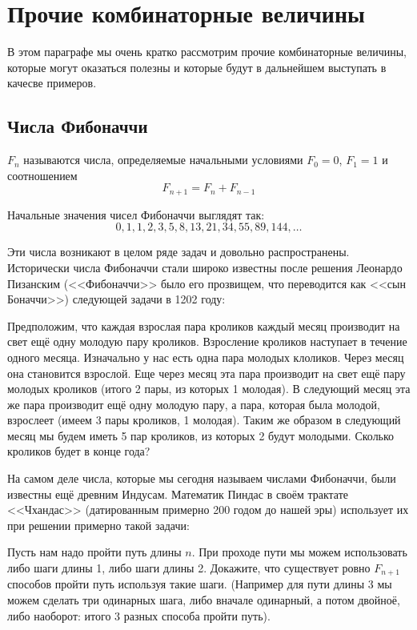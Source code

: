 \section{Прочие комбинаторные величины}

В этом параграфе мы очень кратко рассмотрим прочие комбинаторные величины, которые могут оказаться полезны и которые будут в дальнейшем выступать в качесве примеров.

\subsection{Числа Фибоначчи}

\begin{definition}
 $F_n$ называются числа, определяемые начальными условиями $F_0 = 0$, $F_1 = 1$ и соотношением
$$F_{n+1} = F_n + F_{n-1}$$
\end{definition}

Начальные значения чисел Фибоначчи выглядят так:
$$0, 1, 1, 2, 3, 5, 8, 13, 21, 34, 55, 89, 144, \ldots$$

Эти числа возникают в целом ряде задач и довольно распространены. Исторически числа Фибоначчи стали широко известны после решения Леонардо Пизанским (<<Фибоначчи>>  было его прозвищем, что переводится как <<сын Боначчи>>) следующей задачи в 1202 году:

\begin{exercise}
Предположим, что каждая взрослая пара кроликов каждый месяц производит на свет ещё одну молодую пару кроликов. Взросление кроликов наступает в течение одного месяца. Изначально у нас есть одна пара молодых клоликов. Через месяц она становится взрослой. Еще через месяц эта пара производит на свет ещё пару молодых кроликов (итого 2 пары, из которых 1 молодая). В следующий месяц эта же пара производит ещё одну молодую пару, а пара, которая была молодой, взрослеет (имеем 3 пары кроликов, 1 молодая). Таким же образом в следующий месяц мы будем иметь 5 пар кроликов, из которых 2 будут молодыми. Сколько кроликов будет в конце года?
\end{exercise}

На самом деле числа, которые мы сегодня называем числами Фибоначчи, были известны ещё древним Индусам. Математик Пиндас в своём трактате <<Чхандас>> (датированным примерно 200 годом до нашей эры) использует их при решении примерно такой задачи:

\begin{exercise}
Пусть нам надо пройти путь длины $n$. При проходе пути мы можем использовать либо шаги длины 1, либо шаги длины 2. Докажите, что существует ровно $F_{n+1}$ способов пройти путь используя такие шаги. (Например для пути длины 3 мы можем сделать три одинарных шага, либо вначале одинарный, а потом двойноё, либо наоборот: итого 3 разных способа пройти путь).
\end{exercise}

